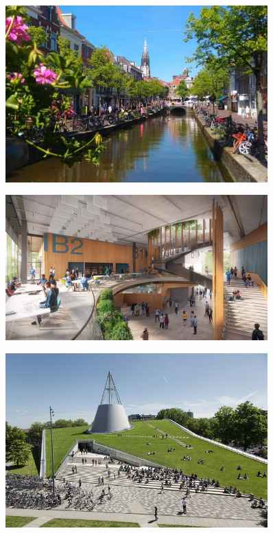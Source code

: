 \begin{frame}
    \delft
    \begin{figure}
        \includegraphics[width=0.9\textwidth]{images/beekje.jpg}
    \end{figure}
\end{frame}

\begin{frame}
    \delft
    \begin{figure}
        \includegraphics[width=0.9\textwidth]{images/echo.jpg}
    \end{figure}
\end{frame}

\begin{frame}
    \delft
    \begin{figure}
        \includegraphics[width=0.9\textwidth]{images/library.jpg}
    \end{figure}
\end{frame}

